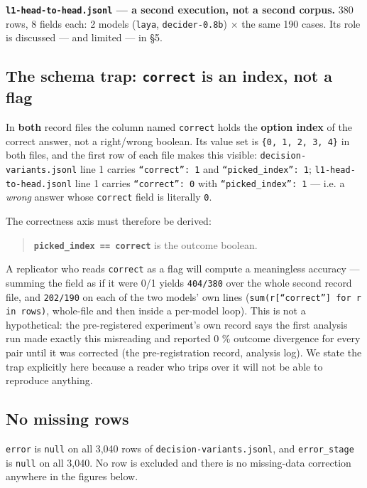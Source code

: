 \documentclass[10pt]{article}
\begin{document}
\textbf{\texttt{l1-head-to-head.jsonl} --- a second execution, not a second corpus.} 380 rows, 8 fields each: 2 models (\texttt{laya}, \texttt{decider-0.8b}) $\times$ the same 190 cases. Its role is discussed --- and limited --- in \S5.

\subsection{The schema trap: \texttt{correct} is an index, not a flag}

In \textbf{both} record files the column named \texttt{correct} holds the \textbf{option index} of the correct answer, not a right/wrong boolean. Its value set is \texttt{\{0, 1, 2, 3, 4\}} in both files, and the first row of each file makes this visible: \texttt{decision-variants.jsonl} line 1 carries \texttt{``correct'': 1} and \texttt{``picked\_index'': 1}; \texttt{l1-head-to-head.jsonl} line 1 carries \texttt{``correct'': 0} with \texttt{``picked\_index'': 1} --- i.e. a \emph{wrong} answer whose \texttt{correct} field is literally \texttt{0}.

The correctness axis must therefore be derived:

\begin{quote}
\textbf{\texttt{picked\_index == correct}} is the outcome boolean.
\end{quote}

A replicator who reads \texttt{correct} as a flag will compute a meaningless accuracy --- summing the field as if it were 0/1 yields \texttt{404/380} over the whole second record file, and \texttt{202/190} on each of the two models' own lines (\texttt{sum(r[``correct''] for r in rows)}, whole-file and then inside a per-model loop). This is not a hypothetical: the pre-registered experiment's own record says the first analysis run made exactly this misreading and reported 0 \% outcome divergence for every pair until it was corrected (the pre-registration record, analysis log). We state the trap explicitly here because a reader who trips over it will not be able to reproduce anything.

\subsection{No missing rows}

\texttt{error} is \texttt{null} on all 3,040 rows of \texttt{decision-variants.jsonl}, and \texttt{error\_stage} is \texttt{null} on all 3,040. No row is excluded and there is no missing-data correction anywhere in the figures below.
\end{document}
